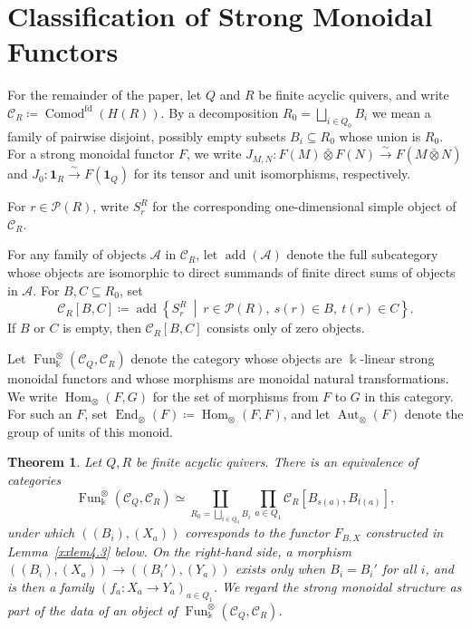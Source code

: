 \documentclass{amsart}
\newcommand{\btensor}{\mathbin{\bar{\otimes}}}
\newtheorem{theorem}{Theorem}[section]
\theoremstyle{definition}
\theoremstyle{remark}
\numberwithin{equation}{section}
\begin{document}
\section{Classification of Strong Monoidal Functors}

For the remainder of the paper, let $Q$ and $R$ be finite acyclic quivers,
and write $\mathcal C_R\coloneqq\operatorname{Comod}^{\mathrm{fd}}(H(R))$.
By a decomposition $R_0=\bigsqcup_{i\in Q_0}B_i$ we mean a family of
pairwise disjoint, possibly empty subsets $B_i\subseteq R_0$ whose union is
$R_0$.
For a strong monoidal functor $F$, we write
$J_{M,N}\colon F(M)\btensor F(N)\xrightarrow{\sim}F(M\btensor N)$ and
$J_0\colon\mathbf1_R\xrightarrow{\sim}F(\mathbf1_Q)$ for its tensor and unit
isomorphisms, respectively.


For $r\in\mathcal P(R)$, write $S_r^R$ for the corresponding
one-dimensional simple object of $\mathcal C_R$.

For any family of objects $\mathcal A$ in $\mathcal C_R$, let
$\operatorname{add}(\mathcal A)$
denote the full subcategory whose objects are isomorphic to direct summands of finite direct sums of objects in $\mathcal A$.
For
$B,C\subseteq R_0$,
set
\[
\mathcal C_R[B,C]
\coloneqq
\operatorname{add}
\left\{
S_r^R\ \middle|\
r\in\mathcal P(R),\
s(r)\in B,\
t(r)\in C
\right\}.
\]
If $B$ or $C$ is empty, then $\mathcal C_R[B,C]$
consists only of zero objects.

Let
$\operatorname{Fun}^{\otimes}_{\Bbbk}(\mathcal C_Q,\mathcal C_R)$
denote the category whose objects are $\Bbbk$-linear strong monoidal functors
and whose morphisms are monoidal natural transformations.
We write $\operatorname{Hom}_{\otimes}(F,G)$ for the set of morphisms from
$F$ to $G$ in this category.
For such an $F$, set
$\operatorname{End}_{\otimes}(F)\coloneqq\operatorname{Hom}_{\otimes}(F,F)$,
and let $\operatorname{Aut}_{\otimes}(F)$ denote the group of units of this
monoid.

\begin{theorem}\label{xxthm4.1}
Let $Q,R$ be finite acyclic quivers.
There is an equivalence of categories
\[
\operatorname{Fun}^{\otimes}_{\Bbbk}(\mathcal C_Q,\mathcal C_R)
\simeq
\coprod_{R_0=\bigsqcup_{i\in Q_0}B_i}
\prod_{a\in Q_1}
\mathcal C_R[B_{s(a)},B_{t(a)}],
\]
under which $((B_i),(X_a))$ corresponds to the functor $F_{B,X}$
constructed in Lemma~\ref{xxlem4.3} below.
On the right-hand side, a morphism
$((B_i),(X_a))\to((B_i'),(Y_a))$ exists only when $B_i=B_i'$ for all $i$,
and is then a family $(f_a\colon X_a\to Y_a)_{a\in Q_1}$.
We regard the strong monoidal structure as part of the data of an object of
$\operatorname{Fun}^{\otimes}_{\Bbbk}(\mathcal C_Q,\mathcal C_R)$.
\end{theorem}
\end{document}
